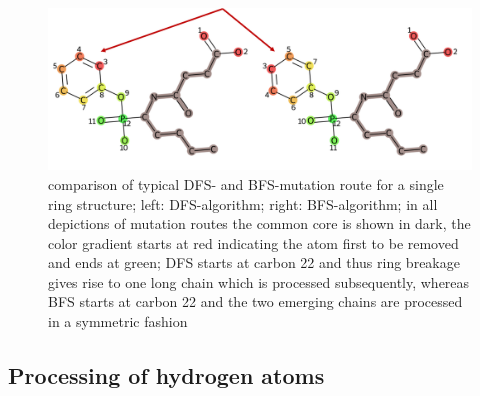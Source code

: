 \begin{figure}
\includegraphics[scale=1.4]{simple_ring_exampledfs.png}

\caption{comparison of typical DFS- and BFS-mutation route for a single ring structure; left: DFS-algorithm; right: BFS-algorithm; in all depictions of mutation routes the common core is shown in dark, the color gradient starts at red indicating the atom first to be removed and ends at green; DFS
starts at carbon 22 and thus ring breakage gives rise to one long
chain which is processed subsequently, whereas BFS starts at carbon
22 and the two emerging chains are processed in a symmetric fashion
}

\end{figure}


\subsection{Processing of hydrogen atoms}


